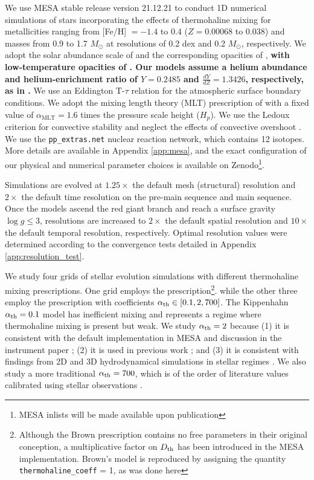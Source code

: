 %
%
%
We use MESA stable release version 21.12.21 to conduct 1D numerical simulations of stars incorporating the effects of thermohaline mixing for metallicities ranging from [Fe/H] $= -1.4$ to $0.4$ ($Z = 0.00068$ to $0.038$) and masses from 0.9 to 1.7 $M_{\odot}$ at resolutions of 0.2 dex and 0.2 $M_{\odot}$, respectively. We adopt the solar abundance scale of \citet{GrevesseSauval1998} and the corresponding opacities of \citet{IglesiasRogers1996}, \textbf{with low-temperature opacities of \citet{Ferguson2005}. Our models assume a helium abundance and helium-enrichment ratio of $Y=0.2485$ and $\frac{dY}{dZ} = 1.3426$, respectively, as in \citet{tayar_etal_2022}.} 
%
We use an Eddington T-$\tau$ relation for the atmospheric surface boundary conditions.
We adopt the mixing length theory (MLT) prescription of \citet{Cox1980} with a fixed value of $\alpha_{\text{MLT}}= 1.6$ times the pressure scale height ($H_p$). We use the Ledoux criterion for convective stability and neglect the effects of convective overshoot \citep{Ledoux1947}. 
We use the \verb|pp_extras.net| nuclear reaction network, which contains 12 isotopes. More details are available in Appendix \ref{app:mesa}, and the exact configuration of our physical and numerical parameter choices is available on Zenodo\footnote{MESA inlists will be made available upon publication}. 

Simulations are evolved at $1.25\times$ the default mesh (structural) resolution and $2\times$ the default time resolution on the pre-main sequence and main sequence. Once the models ascend the red giant branch and reach a surface gravity $\log g \le 3$, resolutions are increased to $2\times$ the default spatial resolution and $10\times$ the default temporal resolution, respectively. Optimal resolution values were determined according to the convergence tests detailed in Appendix \ref{app:resolution_test}. 

We study four grids of stellar evolution simulations with different thermohaline mixing prescriptions. One grid employs the \citet{brown_etal_2013} prescription\footnote{Although the Brown prescription contains no free parameters in their original conception, a multiplicative factor on $D_\mathrm{th}$ has been introduced in the MESA implementation. Brown's model is reproduced by assigning the quantity \texttt{thermohaline\_coeff} = 1, as was done here}. 
%
while the other three employ the \citet{kippenhahn_etal_1980} prescription with coefficients $\alpha_{\rm th} \in [0.1, 2, 700]$.
The Kippenhahn $\alpha_{\rm th} = 0.1$ model has inefficient mixing and represents a regime where thermohaline mixing is present but weak.
We study $\alpha_{\rm th} = 2$ because (1) it is consistent with the default implementation in MESA and discussion in the instrument paper \citep{mesa2}; (2) it is used in previous work \citep{CantielloLanger2010, TayarJoyce22}; and (3) it is consistent with findings from 2D and 3D hydrodynamical simulations in stellar regimes 
\citep{Denissenkov2010, traxler_etal_2011, brown_etal_2013}. We also study a more traditional $\alpha_{\rm th} = 700$, which is of the order of literature values calibrated 
using stellar observations \citep{lattanzio_etal_2015, charbonnel_thermohaline_2007}.

